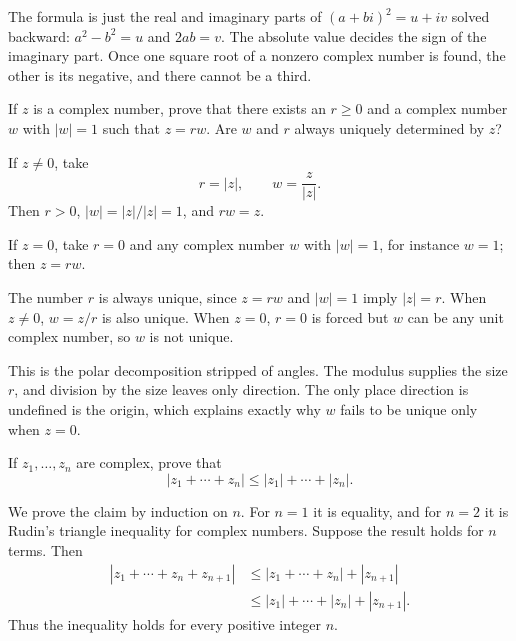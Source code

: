 \documentclass[main.tex]{subfiles}
\begin{document}
\begin{Reflection}
The formula is just the real and imaginary parts of $(a+bi)^2=u+iv$ solved backward:
$a^2-b^2=u$ and $2ab=v$. The absolute value decides the sign of the imaginary part. Once one square
root of a nonzero complex number is found, the other is its negative, and there cannot be a third.
\end{Reflection}

If $z$ is a complex number, prove that there exists an $r\ge 0$ and a complex number $w$ with
$|w|=1$ such that $z=rw$. Are $w$ and $r$ always uniquely determined by $z$?

\begin{SolutionBlue}
If $z\neq0$, take
\[
r=|z|,\qquad w=\frac{z}{|z|}.
\]
Then $r>0$, $|w|=|z|/|z|=1$, and $rw=z$.

If $z=0$, take $r=0$ and any complex number $w$ with $|w|=1$, for instance $w=1$; then $z=rw$.

The number $r$ is always unique, since $z=rw$ and $|w|=1$ imply $|z|=r$. When $z\neq0$, $w=z/r$ is
also unique. When $z=0$, $r=0$ is forced but $w$ can be any unit complex number, so $w$ is not unique.
\end{SolutionBlue}

\begin{Reflection}
This is the polar decomposition stripped of angles. The modulus supplies the size $r$, and division
by the size leaves only direction. The only place direction is undefined is the origin, which explains
exactly why $w$ fails to be unique only when $z=0$.
\end{Reflection}

If $z_1,\dots,z_n$ are complex, prove that
\[
|z_1+\cdots+z_n|\le |z_1|+\cdots+|z_n|.
\]

\begin{SolutionBlue}
We prove the claim by induction on $n$. For $n=1$ it is equality, and for $n=2$ it is Rudin's
triangle inequality for complex numbers. Suppose the result holds for $n$ terms. Then
\[
\begin{aligned}
|z_1+\cdots+z_n+z_{n+1}|
&\le |z_1+\cdots+z_n|+|z_{n+1}|\\
&\le |z_1|+\cdots+|z_n|+|z_{n+1}|.
\end{aligned}
\]
Thus the inequality holds for every positive integer $n$.
\end{SolutionBlue}
\end{document}

